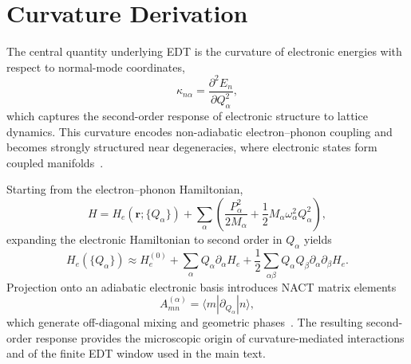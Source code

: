 \section{Curvature Derivation}

The central quantity underlying EDT is the curvature of electronic energies with respect to normal-mode coordinates,
\begin{equation}
\kappa_{n\alpha} = \frac{\partial^2 E_n}{\partial Q_\alpha^2},
\end{equation}
which captures the second-order response of electronic structure to lattice dynamics. This curvature encodes non-adiabatic electron--phonon coupling and becomes strongly structured near degeneracies, where electronic states form coupled manifolds~\cite{Giustino2017,Yarkony1996}.

Starting from the electron--phonon Hamiltonian,
\begin{equation}
H = H_e(\mathbf{r};\{Q_\alpha\}) + \sum_\alpha \left(\frac{P_\alpha^2}{2M_\alpha} + \frac{1}{2}M_\alpha\omega_\alpha^2 Q_\alpha^2\right),
\end{equation}
expanding the electronic Hamiltonian to second order in $Q_\alpha$ yields
\begin{equation}
H_e(\{Q_\alpha\}) \approx H_e^{(0)} + \sum_\alpha Q_\alpha \partial_\alpha H_e + \frac{1}{2}\sum_{\alpha\beta} Q_\alpha Q_\beta \partial_\alpha\partial_\beta H_e .
\end{equation}
Projection onto an adiabatic electronic basis introduces NACT matrix elements
\begin{equation}
A_{mn}^{(\alpha)} = \langle m | \partial_{Q_\alpha} | n \rangle,
\end{equation}
which generate off-diagonal mixing and geometric phases~\cite{Mead1979,Berry1984}. The resulting second-order response provides the microscopic origin of curvature-mediated interactions and of the finite EDT window used in the main text.
